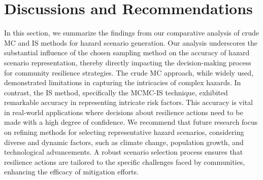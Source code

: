 \section{Discussions and Recommendations}
    In this section, we summarize the findings from our comparative analysis of crude MC and IS methods for hazard scenario generation. Our analysis underscores the substantial influence of the chosen sampling method on the accuracy of hazard scenario representation, thereby directly impacting the decision-making process for community resilience strategies. The crude MC approach, while widely used, demonstrated limitations in capturing the intricacies of complex hazards. In contrast, the IS method, specifically the MCMC-IS technique, exhibited remarkable accuracy in representing intricate risk factors. This accuracy is vital in real-world applications where decisions about resilience actions need to be made with a high degree of confidence.
    We recommend that future research focus on refining methods for selecting representative hazard scenarios, considering diverse and dynamic factors, such as climate change, population growth, and technological advancements. A robust scenario selection process ensures that resilience actions are tailored to the specific challenges faced by communities, enhancing the efficacy of mitigation efforts.